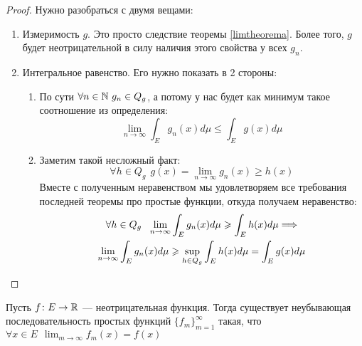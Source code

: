 \begin{proof}
	Нужно разобраться с двумя вещами:
	\begin{enumerate}
		\item Измеримость $g$. Это просто следствие теоремы \ref{limtheorema}. Более того, $g$ будет неотрицательной в силу наличия этого свойства у всех $g_n$.
		
		\item Интегральное равенство. Его нужно показать в 2 стороны:
		\begin{enumerate}
			\item По сути $\forall n \in \mathbb{N}\ g_n \in Q_g$, а потому у нас будет как минимум такое соотношение из определения:
			\[
				\lim_{n \to \infty} \int_E g_n(x)d\mu \le \int_E g(x)d\mu
			\]
			
			\item Заметим такой несложный факт:
			\[
				\forall h \in Q_g\ \ g(x) = \lim_{n \to \infty} g_n(x) \ge h(x)
			\]
			Вместе с полученным неравенством мы удовлетворяем все требования последней теоремы про простые функции, откуда получаем неравенство:
			\begin{multline*}
				\forall h \in Q_g\ \ \lim_{n \to \infty} \int_E g_n(x)d\mu \geqslant \int_E h(x)d\mu \Longrightarrow
				\\
				\lim_{n \to \infty} \int_E g_n(x)d\mu \geqslant \sup_{h \in Q_g} \int_E h(x)d\mu = \int_E g(x)d\mu
			\end{multline*}
		\end{enumerate}
	\end{enumerate}
\end{proof}

\begin{lemma}
	Пусть $f \colon E \to \mathbb{R}$ --- неотрицательная функция. Тогда существует неубывающая последовательность простых функций $\{f_m\}_{m = 1}^\infty$ такая, что $\forall x \in E\ \ \lim_{m \to \infty} f_m(x) = f(x)$
\end{lemma}

